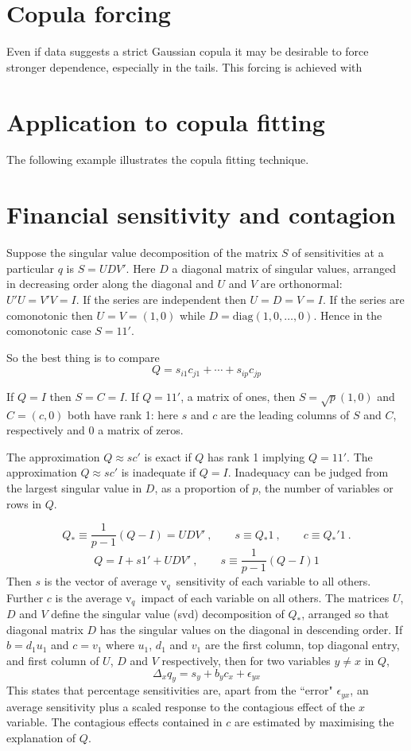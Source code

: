 \documentclass[authoryear]{elsarticle}
\newcommand{\diag}{\mathrm{diag}}
\newcommand{\eps}{\epsilon}
\renewcommand{\v}{\ensuremath{\mathrm{v}_q}}
\newcommand{\cq}{\ , \qquad}
\begin{document}
\section{Copula forcing}

Even if data suggests a strict Gaussian copula it  may be desirable to force stronger dependence, especially in the tails. This forcing is achieved with 

\section{Application to copula fitting}

The following example illustrates the copula fitting technique.




\section{Financial sensitivity and contagion}
 

Suppose the singular value decomposition of the  matrix $S$ of sensitivities at a particular $q$ is 
$S= UDV'$.  Here  $D$ a diagonal matrix of singular values, arranged in decreasing order along the diagonal and $U$ and $V$ are orthonormal:  $U'U=V'V=I$.  If the series are independent then $U=D=V=I$.   If the series are comonotonic then $U=V=(1,0)$ while $D=\diag(1,0,\ldots,0)$.  Hence in the comonotonic case $S=11'$.

So the best thing is to compare 
$$
Q= s_{i1}c_{j1} + \cdots + s_{ip}c_{jp} 
$$

If $Q=I$ then $S=C=I$.   If $Q=11'$, a matrix of ones, then $S=\sqrt{p}(1,0)$ and $C=(c,0)$ both have rank 1:  here $s$ and $c$ are the leading columns of $S$ and $C$, respectively and 0 a matrix of zeros.

The approximation $Q\approx sc'$ is exact if $Q$ has rank 1 implying $Q=11'$.   The approximation $Q\approx sc'$ is inadequate if $Q=I$.  Inadequacy can be judged from the largest singular value in $D$, as a proportion of $p$, the number of variables or rows in $Q$.

$$
Q_* \equiv \frac{1}{p-1}(Q-I)=UDV'\cq s\equiv Q_*1\cq c\equiv Q_*'1\ .
$$$$
Q=I + s1'+ UDV'\cq s\equiv \frac{1}{p-1}(Q-I)1
$$
Then $s$ is the vector of average \v\ sensitivity of each variable to all others.  Further $c$ is the average \v\ impact of each variable on all others.   The matrices $U$, $D$ and $V$ define the singular value (svd) decomposition of $Q_*$, arranged so that diagonal matrix $D$ has the singular values on  the diagonal in descending order.   If $b=d_1u_1$ and $c=v_1$ where $u_1$, $d_1$ and $v_1$ are the first column, top diagonal entry, and first column of $U$, $D$ and $V$ respectively, then  for two variables $y\ne x$ in $Q$,
$$
\Delta_x q_y = s_y+ b_yc_x +\eps_{yx}
$$
This states that percentage sensitivities are, apart from the ``error" $\eps_{yx}$, an average sensitivity plus a scaled response to the contagious effect of the $x$ variable.   The contagious effects contained in $c$ are estimated by maximising the explanation of $Q$.
\end{document}
